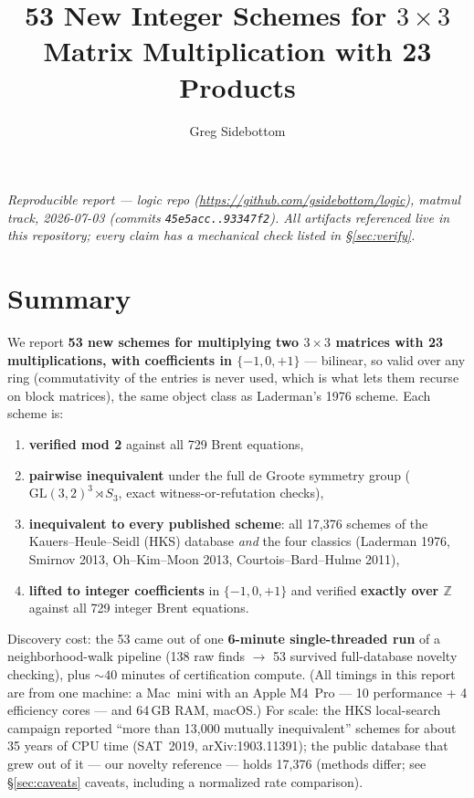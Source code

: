 \documentclass[10pt]{article}
\title{\bfseries 53 New Integer Schemes for $3\times 3$ Matrix
  Multiplication with 23 Products}
\author{Greg Sidebottom}
\date{}
\begin{document}
\maketitle
\vspace{-3em}
\begin{center}
\itshape Reproducible report --- logic repo
(\url{https://github.com/gsidebottom/logic}), matmul track, 2026-07-03
(commits \texttt{45e5acc..93347f2}). All artifacts referenced live in
this repository; every claim has a mechanical check listed in
\S\ref{sec:verify}.
\end{center}

\section{Summary}\label{sec:summary}

We report \textbf{53 new schemes for multiplying two $3\times 3$
matrices with 23 multiplications, with coefficients in $\{-1,0,+1\}$}
--- bilinear, so valid over any ring (commutativity of the entries is
never used, which is what lets them recurse on block matrices), the
same object class as Laderman's 1976 scheme. Each scheme is:

\begin{enumerate}[itemsep=1pt]
\item \textbf{verified mod 2} against all 729 Brent equations,
\item \textbf{pairwise inequivalent} under the full de Groote symmetry
  group ($\mathrm{GL}(3,2)^3 \rtimes S_3$, exact witness-or-refutation
  checks),
\item \textbf{inequivalent to every published scheme}: all 17{,}376
  schemes of the Kauers--Heule--Seidl (HKS) database \emph{and} the four
  classics (Laderman 1976, Smirnov 2013, Oh--Kim--Moon 2013,
  Courtois--Bard--Hulme 2011),
\item \textbf{lifted to integer coefficients} in $\{-1,0,+1\}$ and
  verified \textbf{exactly over $\mathbb{Z}$} against all 729 integer
  Brent equations.
\end{enumerate}

Discovery cost: the 53 came out of one \textbf{6-minute single-threaded
run} of a neighborhood-walk pipeline (138 raw finds $\rightarrow$ 53
survived full-database novelty checking), plus ${\sim}40$ minutes of
certification compute. (All timings in this report are from one
machine: a Mac~mini with an Apple M4~Pro --- 10 performance + 4
efficiency cores --- and 64\,GB RAM, macOS.) For scale: the HKS
local-search campaign reported ``more than 13{,}000 mutually
inequivalent'' schemes for about 35 years of CPU time (SAT~2019,
arXiv:1903.11391); the public database that grew out of it --- our
novelty reference --- holds 17{,}376 (methods differ; see
\S\ref{sec:caveats} caveats, including a normalized rate
comparison).
\end{document}
